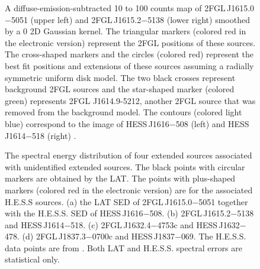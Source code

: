 \documentclass[12pt,preprint]{aastex}
\newif\ifcolorfigure
\newcommand{\gev}{\text{GeV}\xspace}
\newcommand{\tev}{\text{TeV}\xspace}
\begin{document}
\begin{figure}
    \ifcolorfigure
      \plotone{source_plots/source_HESS_J1614-518_color.eps}
    \else
    \fi
  \caption{
    A diffuse-emission-subtracted 10 \gev to 100 \gev counts
    map of 2FGL\,J1615.0$-$5051 (upper left)
    and 2FGL\,J1615.2$-$5138 (lower right) smoothed by a 0
    2D Gaussian kernel.  The triangular markers (colored red in the
    electronic version) represent the 2FGL positions of these sources.
    The cross-shaped markers and the
    circles (colored red) represent the best fit
    positions and extensions of these sources assuming a radially
    symmetric uniform disk model.  
    The two black crosses represent  background 2FGL sources and
    the star-shaped
    marker (colored green) represents 2FGL J1614.9-5212, another 2FGL
    source that was removed from the background
    model. The contours (colored light blue) correspond to the \tev
    image of HESS\,J1616$-$508 (left) and HESS\,J1614$-$518 (right)
    \citep{hess_plane_survey}.   
    }\label{1FGL_J1613.6-5100c}
\end{figure}


\clearpage
\begin{figure}
    \ifcolorfigure
      \plotone{summary_plots/hess_seds_color.eps}
    \else
    \fi
    \caption{
    The spectral energy distribution of four extended
    sources associated with unidentified
    extended \tev sources.  The black points
    with circular markers are obtained by the LAT. The points with
    plus-shaped markers (colored red in the electronic version) are
    for the associated H.E.S.S sources.  (a) the
    LAT SED of 2FGL\,J1615.0$-$5051 together with the H.E.S.S. SED
    of HESS\,J1616$-$508. (b) 2FGL\,J1615.2$-$5138
    and HESS\,J1614$-$518. (c) 2FGL\,J1632.4$-$4753c
    and HESS\,J1632$-$478. (d) 2FGL\,J1837.3$-$0700c
    and HESS\,J1837$-$069. The H.E.S.S. data points are from
    \citep{hess_plane_survey}. Both LAT and H.E.S.S. spectral errors are
    statistical only.}
    \label{hess_seds}
  \end{figure}
\end{document}
